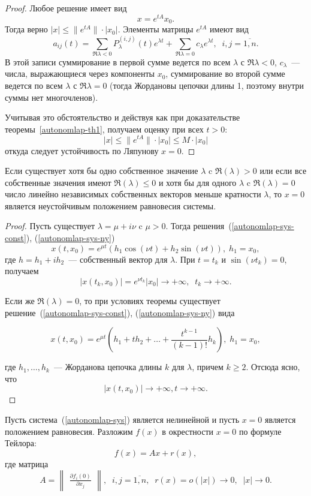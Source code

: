 \begin{proof}
Любое решение имеет вид \[x = e^{tA} x_0.\]
Тогда верно \(|x| \leq \|e^{tA}\| \cdot |x_0|\).
Элементы матрицы $e^{tA}$ имеют вид
\[
a_{ij}(t) = \sum_{\Re{\lambda} < 0} P_{\lambda}^{(i, j)}(t) e^{\lambda t} + 
 \sum_{\Re{\lambda} = 0} c_{\lambda} e^{\lambda t}, \;\;  i,j = \overline{1, n}.
\]
В этой записи суммирование в первой сумме ведется по всем $\lambda$ с $\Re{\lambda} < 0$, $c_{\lambda}$~--- числа, выражающиеся через компоненты $x_0$, суммирование во второй сумме ведется по всем $\lambda$ с $\Re{\lambda} = 0$ (тогда Жордановы цепочки длины 1, поэтому внутри суммы нет многочленов).

Учитывая это обстоятельство и действуя как при доказательстве теоремы~\ref{autonomlap-th1}, получаем оценку при всех $t > 0$:
\[
|x| \leq \|e^{tA}\| \cdot |x_0| \leq M \cdot |x_0|
\]
откуда следует устойчивость по Ляпунову $x = 0$.
\end{proof}

\begin{theorem}
Если существует хотя бы одно собственное значение $\lambda$ c $\Re(\lambda) > 0$ или если все собственные значения имеют $\Re(\lambda) \leq 0$ и хотя бы для одного $\lambda$ c $\Re(\lambda) = 0$ число линейно независимых собственных векторов меньше кратности $\lambda$, то $x = 0$ является неустойчивым положением равновесия системы.
\end{theorem}
\begin{proof}
Пусть существует $\lambda = \mu + i\nu$ c $\mu > 0$. Тогда решения~(\ref{autonomlap-sys-const}), (\ref{autonomlap-sys-ny})
\[x(t, x_0) = e^{\mu t}(h_1 \cos(\nu t) + h_2 \sin(\nu t)),\; h_1 = x_0,\]
где $h = h_1 + i h_2$~--- собственный вектор для $\lambda$. При $t = t_k$ и $\sin(\nu t_k) = 0$, получаем
\[|x(t_k, x_0)| = e^{\nu t_k} |x_0| \rightarrow +\infty, \;\; t_k \rightarrow +\infty.\]

Если же $\Re(\lambda) = 0$, то при условиях теоремы существует решение~(\ref{autonomlap-sys-const}), (\ref{autonomlap-sys-ny}) вида 

\[x(t, x_0) = e^{\mu t} \left(h_1 + t h_2 + \ldots + \frac{t^{k-1}}{(k-1)!}h_k\right),\; h_1 = x_0,\]

где $h_1, \ldots, h_k$~--- Жорданова цепочка длины $k$ для $\lambda$, причем $k \geq 2$. Отсюда ясно, что 
\[|x(t, x_0)| \rightarrow +\infty, t \rightarrow + \infty.\]

\end{proof}

Пусть система~(\ref{autonomlap-sys}) является нелинейной и пусть $x = 0$ является положением равновесия. Разложим $f(x)$ в окрестности $x = 0$ по формуле Тейлора:
\[
f(x) = Ax + r(x),
\]
где матрица
\[A = \begin{Vmatrix} \frac{\partial f_i(0)}{\partial x_j} \end{Vmatrix},\;\; i, j = \overline{1, n}, \;\;r(x) = o(|x|) \rightarrow 0,\;\; |x| \rightarrow 0.\]

